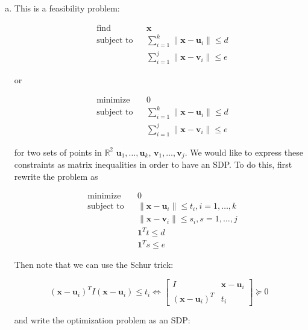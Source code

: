 \begin{enumerate}[(1)]
\begin{enumerate}[(a)]

\item This is a feasibility problem:

\[
\begin{aligned}
& {\text{find}}
& & \boldsymbol{x} \\
& \text{subject to}
& & \sum_{i=1}^k \lVert \boldsymbol{x} - \boldsymbol{u}_i \rVert \leq d \\
& & & \sum_{i=1}^j \lVert \boldsymbol{x} - \boldsymbol{v}_i \rVert \leq e 
\end{aligned}
\]

or

\[
\begin{aligned}
& {\text{minimize}}
& & 0 \\
& \text{subject to}
& & \sum_{i=1}^k \lVert \boldsymbol{x} - \boldsymbol{u}_i \rVert \leq d \\
& & & \sum_{i=1}^j \lVert \boldsymbol{x} - \boldsymbol{v}_i \rVert \leq e 
\end{aligned}
\]

for two sets of points in \(\mathbb{R}^2\) \(\boldsymbol{u}_1, \ldots, \boldsymbol{u}_k\), \(\boldsymbol{v}_1, \ldots, \boldsymbol{v}_j\). We would like to express these constraints as matrix inequalities in order to have an SDP. To do this, first rewrite the problem as 

\[
\begin{aligned}
& {\text{minimize}}
& & 0 \\
& \text{subject to}
& & \lVert \boldsymbol{x} - \boldsymbol{u}_i \rVert \leq t_i, i = 1, \ldots, k \\
& & & \lVert \boldsymbol{x} - \boldsymbol{v}_i \rVert \leq s_i, s = 1, \ldots, j \\
& & & \boldsymbol{1}^T t \leq d \\
& & & \boldsymbol{1}^T s \leq e
\end{aligned}
\]

Then note that we can use the Schur trick:

\[
(\boldsymbol{x} - \boldsymbol{u}_i )^T I (\boldsymbol{x} - \boldsymbol{u}_i )  \leq t_i \iff  \begin{bmatrix}
    I      & \boldsymbol{x} - \boldsymbol{u}_i\\
    (\boldsymbol{x} - \boldsymbol{u}_i)^T & t_i
\end{bmatrix} \succeq 0 
\]

and write the optimization problem as an SDP:


\end{enumerate}
\end{enumerate}
